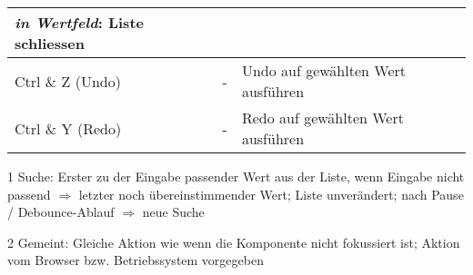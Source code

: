\begin{table}[ht!]
\begin{threeparttable}
\begin{tabular}{ l || l | l }
{                                                  \textit{in Wertfeld}: Liste schliessen} \\
            \hline \hline
            Ctrl \& Z (Undo)    & -       & Undo auf gewählten Wert ausführen         \\
            \hline
            Ctrl \& Y (Redo)    & -       & Redo auf gewählten Wert ausführen         \\
            \hline
        \end{tabular}
        \begin{tablenotes}
            \scriptsize
            \item[1] Suche: Erster zu der Eingabe passender Wert aus der Liste, wenn Eingabe nicht passend $\Rightarrow$ letzter noch übereinstimmender Wert; 
                            Liste unverändert; nach Pause / Debounce-Ablauf $\Rightarrow$ neue Suche
            \item[2] Gemeint: Gleiche Aktion wie wenn die Komponente nicht fokussiert ist; Aktion vom Browser bzw. Betriebssystem vorgegeben
        \end{tablenotes}
    \end{threeparttable}
\end{table}
